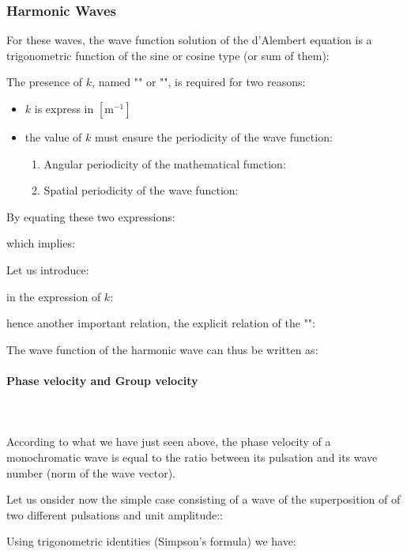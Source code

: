 	\subsubsection{Harmonic Waves}
	For these waves, the wave function solution of the d'Alembert equation is a trigonometric function of the sine or cosine type (or sum of them):
	
	The presence of $k$, named "" or "", is required for two reasons:
	\begin{itemize}
		\item $k$ is express in $[\text{m}^{-1}]$ 

		\item the value of $k$ must ensure the periodicity of the wave function:
		\begin{enumerate}
			\item Angular periodicity of the mathematical function:
			
	
			\item Spatial periodicity of the wave function:
			
		\end{enumerate}
	\end{itemize}
	By equating these two expressions:
	
	which implies:
	
		Let us introduce:
	
	in the expression of $k$:
	
	hence another important relation, the explicit relation of the "":
	
	The wave function of the harmonic wave can thus be written as:
	
	
	\paragraph{Phase velocity and Group velocity}\mbox{}\\\\
	According to what we have just seen above, the phase velocity of a monochromatic wave is equal to the ratio between its pulsation and its wave number (norm of the wave vector).

	Let us onsider now the simple case consisting of a wave of the superposition of of two different pulsations and unit amplitude::
	
	Using trigonometric identities (Simpson's formula) we have:
	
